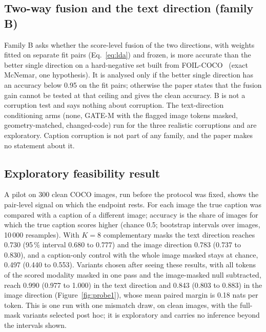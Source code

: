 \subsection{Two-way fusion and the text direction (family B)}\label{ssec:fusionprotocol}
Family B asks whether the score-level fusion of the two directions, with weights fitted on separate fit pairs (Eq.~\eqref{eq:lda}) and
frozen, is more accurate than the better single direction on a hard-negative set built from FOIL-COCO~\cite{shekhar2017foil} (exact McNemar, one hypothesis).
It is analysed only if the better single direction has an accuracy below 0.95 on the fit pairs; otherwise the paper states that the
fusion gain cannot be tested at that ceiling and gives the clean accuracy.
B is not a corruption test and says nothing about corruption.
The text-direction conditioning arms (none, GATE-M with the flagged image tokens masked, geometry-matched, changed-code) run for the
three realistic corruptions and are exploratory.
Caption corruption is not part of any family, and the paper makes no statement about it.

\subsection{Exploratory feasibility result}\label{ssec:pilot}
A pilot on 300 clean COCO images, run before the protocol was fixed, shows the pair-level signal on which the endpoint rests.
For each image the true caption was compared with a caption of a different image; accuracy is the share of images for which the true
caption scores higher (chance 0.5; bootstrap intervals over images, 10\,000 resamples).
With $K=8$ complementary masks the text direction reaches 0.730 (95\,\% interval 0.680 to 0.777) and the image direction 0.783
(0.737 to 0.830), and a caption-only control with the whole image masked stays at chance, 0.497 (0.440 to 0.553).
Variants chosen after seeing these results, with all tokens of the scored modality masked in one pass and the image-masked null
subtracted, reach 0.990 (0.977 to 1.000) in the text direction and 0.843 (0.803 to 0.883) in the image direction
(Figure~\ref{fig:probe1}), whose mean paired margin is 0.18 nats per token.
This is one run with one mismatch draw, on clean images, with the full-mask variants selected post hoc; it is exploratory and
carries no inference beyond the intervals shown.

